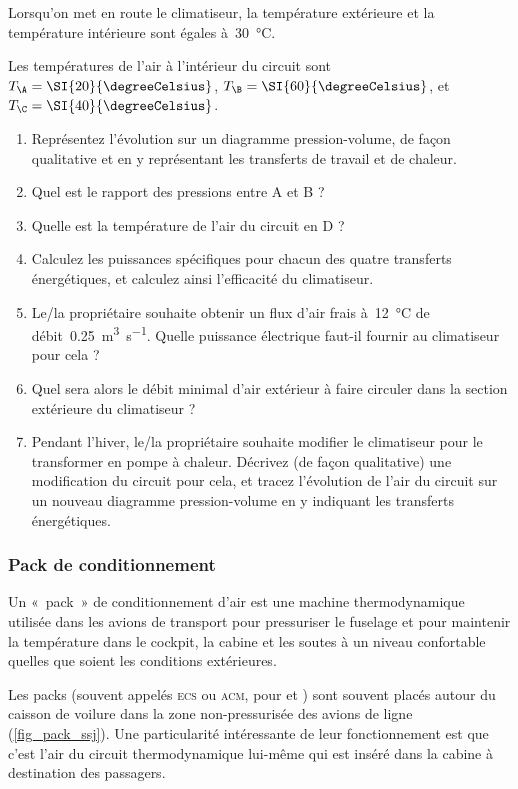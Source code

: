 	Lorsqu’on met en route le climatiseur, la température extérieure et la température intérieure sont égales à~\SI{30}{\degreeCelsius}.

	Les températures de l’air à l’intérieur du circuit sont $T_\A = \SI{20}{\degreeCelsius}$, $T_\B = \SI{60}{\degreeCelsius}$, et~$T_\C = \SI{40}{\degreeCelsius}$.

	\begin{enumerate}
		\item Représentez l’évolution sur un diagramme pression-volume, de façon qualitative et en y représentant les transferts de travail et de chaleur.
		\item Quel est le rapport des pressions entre A et B ?
		\item Quelle est la température de l’air du circuit en D ?
		\item Calculez les puissances spécifiques pour chacun des quatre transferts énergétiques, et calculez ainsi l’efficacité du climatiseur.
		\item Le/la propriétaire souhaite obtenir un flux d’air frais à~\SI{12}{\degreeCelsius} de débit~\SI{0,25}{\metre\cubed\per\second}. Quelle puissance électrique faut-il fournir au climatiseur pour cela ?
		\item Quel sera alors le débit minimal d’air extérieur à faire circuler dans la section extérieure du climatiseur ?
		\item Pendant l’hiver, le/la propriétaire souhaite modifier le climatiseur pour le transformer en pompe à chaleur. Décrivez (de façon qualitative) une modification du circuit pour cela, et tracez l’évolution de l’air du circuit sur un nouveau diagramme pression-volume en y indiquant les transferts énergétiques.
	\end{enumerate}


\subsubsection{Pack de conditionnement}
\label{exo_pack_conditonnement}

	Un «~pack~» de conditionnement d’air est une machine thermodynamique utilisée dans les avions de transport pour pressuriser le fuselage et pour maintenir la température dans le cockpit, la cabine et les soutes à un niveau confortable quelles que soient les conditions extérieures.
	
	Les packs (souvent appelés \textsc{ecs} ou \textsc{acm}, pour  et ) sont souvent placés autour du caisson de voilure dans la zone non-pressurisée des avions de ligne (\cref{fig_pack_ssj}). Une particularité intéressante de leur fonctionnement est que c’est l’air du circuit thermodynamique lui-même qui est inséré dans la cabine à destination des passagers.
	
